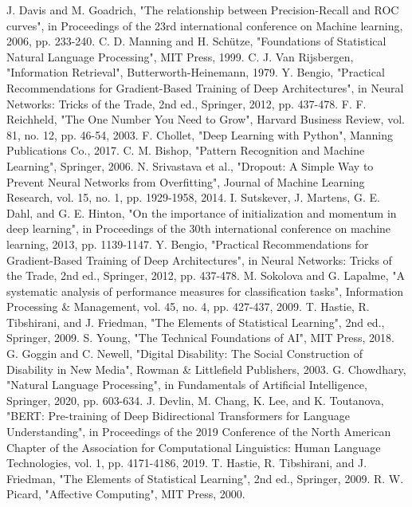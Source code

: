 \documentclass[conference]{IEEEtran}
\begin{document}
\begin{thebibliography}{00}
     J. Davis and M. Goadrich, "The relationship between Precision-Recall and ROC curves", in Proceedings of the 23rd international conference on Machine learning, 2006, pp. 233-240.
     C. D. Manning and H. Schütze, "Foundations of Statistical Natural Language Processing", MIT Press, 1999.
     C. J. Van Rijsbergen, "Information Retrieval", Butterworth-Heinemann, 1979.
     Y. Bengio, "Practical Recommendations for Gradient-Based Training of Deep Architectures", in Neural Networks: Tricks of the Trade, 2nd ed., Springer, 2012, pp. 437-478.
     F. F. Reichheld, "The One Number You Need to Grow", Harvard Business Review, vol. 81, no. 12, pp. 46-54, 2003.
     F. Chollet, "Deep Learning with Python", Manning Publications Co., 2017.
     C. M. Bishop, "Pattern Recognition and Machine Learning", Springer, 2006.
     N. Srivastava et al., "Dropout: A Simple Way to Prevent Neural Networks from Overfitting", Journal of Machine Learning Research, vol. 15, no. 1, pp. 1929-1958, 2014.
     I. Sutskever, J. Martens, G. E. Dahl, and G. E. Hinton, "On the importance of initialization and momentum in deep learning", in Proceedings of the 30th international conference on machine learning, 2013, pp. 1139-1147.
     Y. Bengio, "Practical Recommendations for Gradient-Based Training of Deep Architectures", in Neural Networks: Tricks of the Trade, 2nd ed., Springer, 2012, pp. 437-478.
     M. Sokolova and G. Lapalme, "A systematic analysis of performance measures for classification tasks", Information Processing \& Management, vol. 45, no. 4, pp. 427-437, 2009.
     T. Hastie, R. Tibshirani, and J. Friedman, "The Elements of Statistical Learning", 2nd ed., Springer, 2009.
     S. Young, "The Technical Foundations of AI", MIT Press, 2018.
     G. Goggin and C. Newell, "Digital Disability: The Social Construction of Disability in New Media", Rowman \& Littlefield Publishers, 2003.
     G. Chowdhary, "Natural Language Processing", in Fundamentals of Artificial Intelligence, Springer, 2020, pp. 603-634.
     J. Devlin, M. Chang, K. Lee, and K. Toutanova, "BERT: Pre-training of Deep Bidirectional Transformers for Language Understanding", in Proceedings of the 2019 Conference of the North American Chapter of the Association for Computational Linguistics: Human Language Technologies, vol. 1, pp. 4171-4186, 2019.
     T. Hastie, R. Tibshirani, and J. Friedman, "The Elements of Statistical Learning", 2nd ed., Springer, 2009.
     R. W. Picard, "Affective Computing", MIT Press, 2000.
    
\end{thebibliography}
\end{document}
